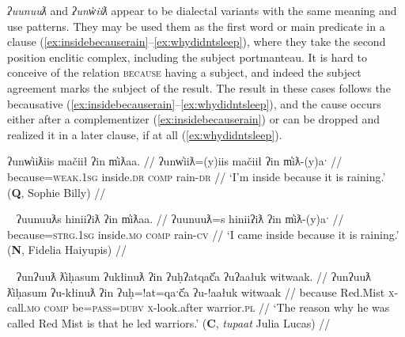 \textit{ʔuunuuƛ} and \textit{ʔunw̓iiƛ} appear to be dialectal variants with the same meaning and use patterns. They may be used them as the first word or main predicate in a clause (\ref{ex:insidebecauserain}--\ref{ex:whydidntsleep}), where they take the second position enclitic complex, including the subject portmanteau. It is hard to conceive of the relation \textsc{because} having a subject, and indeed the subject agreement marks the subject of the result. The result in these cases follows the becausative (\ref{ex:insidebecauserain}--\ref{ex:whydidntsleep}), and the cause occurs either after a complementizer (\ref{ex:insidebecauserain}) or can be dropped and realized it in a later clause, if at all (\ref{ex:whydidntsleep}).

\begin{comment}
\ex \label{ex:uunuutl0}
\begingl
\glpreamble wiiksinḥimaḥ teʔiłšiƛ ʔuunuuƛ wałaakqas c̓uumuʕas. //
\gla wik-L.sinḥi=(m)aˑḥ teʔił-šiƛ ʔuunuuƛ wałaak=qaˑs c̓uumuʕas //
\glb \textsc{neg}-try.to.do=\textsc{real.1sg} sick.\textsc{dr}-\textsc{mo} because go.\textsc{dr}=\textsc{defn.1sg} Port.Alberni //
\glft `I’m trying not to get sick because I am going to Port Alberni.' (\textbf{B}, Bob Mundy) //
\endgl
\xe
\end{comment}


\ex \label{ex:insidebecauserain}
\begingl
\glpreamble ʔunw̓iiƛiis mačiił ʔin m̓iƛaa. //
\gla ʔunw̓iiƛ=(y)iis mačiił ʔin m̓iƛ-(y)aˑ //
\glb because=\textsc{weak.1sg} inside.\textsc{dr} \textsc{comp} rain-\textsc{dr} //
\glft `I'm inside because it is raining.' (\textbf{Q}, Sophie Billy) //
\endgl
\xe

\ex~ \label{ex:inisidebecauserain2}
\begingl
\glpreamble ʔuunuuƛs hiniiʔiƛ ʔin m̓iƛaa. //
\gla ʔuunuuƛ=s hiniiʔiƛ ʔin m̓iƛ-(y)aˑ //
\glb because=\textsc{strg.1sg} inside.\textsc{mo} \textsc{comp} rain-\textsc{cv} //
\glft `I came inside because it is raining.' (\textbf{N}, Fidelia Haiyupis) //
\endgl
\xe

\ex~ \label{ex:uunuutltlihasum}
\begingl
\glpreamble ʔunʔuuƛ ƛ̓iḥasum ʔukłinuƛ ʔin ʔuḥʔatqač̓a ʔuʔaałuk witwaak. //
\gla ʔunʔuuƛ ƛ̓iḥasum ʔu-kłinuƛ ʔin ʔuḥ=!at=qaˑč̓a ʔu-!aałuk witwaak //
\glb because Red.Mist \textsc{x}-call.\textsc{mo} \textsc{comp} be=\textsc{pass}=\textsc{dubv} \textsc{x}-look.after warrior.\textsc{pl} //
\glft `The reason why he was called Red Mist is that he led warriors.' (\textbf{C}, \textit{tupaat} Julia Lucas) //
\endgl
\xe

